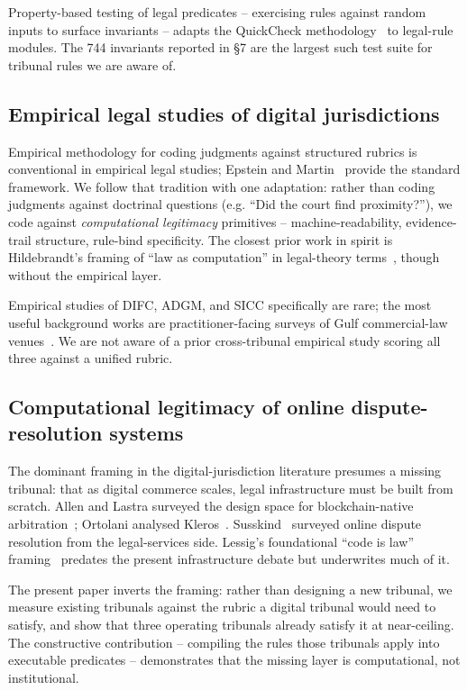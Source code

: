 \documentclass[11pt,letterpaper]{article}
\begin{document}
Property-based testing of legal predicates -- exercising rules against random inputs to surface invariants -- adapts the QuickCheck methodology~\cite{quickcheck} to legal-rule modules. The 744 invariants reported in \S 7 are the largest such test suite for tribunal rules we are aware of.

\subsection{Empirical legal studies of digital jurisdictions}

Empirical methodology for coding judgments against structured rubrics is conventional in empirical legal studies; Epstein and Martin~\cite{epsteinmartin} provide the standard framework. We follow that tradition with one adaptation: rather than coding judgments against doctrinal questions (e.g. ``Did the court find proximity?''), we code against \textit{computational legitimacy} primitives -- machine-readability, evidence-trail structure, rule-bind specificity. The closest prior work in spirit is Hildebrandt's framing of ``law as computation'' in legal-theory terms~\cite{hildebrandt}, though without the empirical layer.

Empirical studies of DIFC, ADGM, and SICC specifically are rare; the most useful background works are practitioner-facing surveys of Gulf commercial-law venues~\cite{gulflitsurvey,sicc-overview}. We are not aware of a prior cross-tribunal empirical study scoring all three against a unified rubric.

\subsection{Computational legitimacy of online dispute-resolution systems}

The dominant framing in the digital-jurisdiction literature presumes a missing tribunal: that as digital commerce scales, legal infrastructure must be built from scratch. Allen and Lastra surveyed the design space for blockchain-native arbitration~\cite{allenlastra}; Ortolani analysed Kleros~\cite{ortolani}. Susskind~\cite{susskind-online,susskind-tomorrow} surveyed online dispute resolution from the legal-services side. Lessig's foundational ``code is law'' framing~\cite{lessig} predates the present infrastructure debate but underwrites much of it.

The present paper inverts the framing: rather than designing a new tribunal, we measure existing tribunals against the rubric a digital tribunal would need to satisfy, and show that three operating tribunals already satisfy it at near-ceiling. The constructive contribution -- compiling the rules those tribunals apply into executable predicates -- demonstrates that the missing layer is computational, not institutional.
\end{document}
